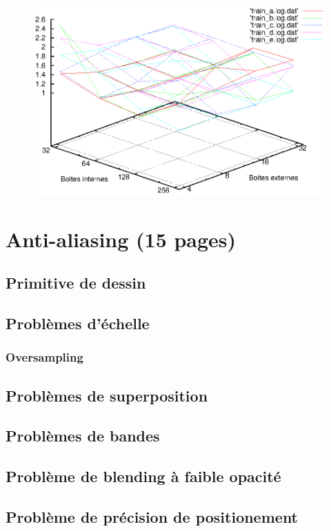 				\begin{figure}[h]
					\centering
					\includegraphics[width=\textwidth]{images/depthgraphr1.eps} 
					\label{fig:depthgraphr1}
				\end{figure}




\chapter{Anti-aliasing (15 pages) }
	\section{Primitive de dessin}
	\section{Problèmes d'échelle}
		\subsection{Oversampling}
	\section{Problèmes de superposition}
	\section{Problèmes de bandes}
	\section{Problème de blending à faible opacité}
	\section{Problème de précision de positionement}
